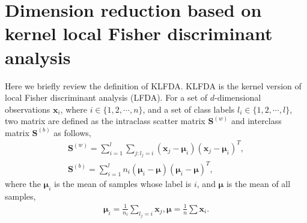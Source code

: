\documentclass[10pt,twocolumn,letterpaper]{article}
\begin{document}
\section{Dimension reduction based on kernel local Fisher discriminant analysis }

Here we briefly review the definition of KLFDA. KLFDA is the kernel version of local Fisher discriminant analysis (LFDA). For a set of $d$-dimensional observations $\bm{x}_i$, where $i\in\{1,2,\cdots,n\}$, and a set of class labels $l_i\in\{1,2,\cdots,l\}$, two matrix are defined as the intraclass scatter matrix $\bm{S}^{(w)}$ and interclass matrix
$\bm{S}^{(b)}$ as follows,
\begin{equation}
\begin{aligned}
\bm{S}^{(w)} = \mathop{\sum} _{i=1}^l\mathop{\sum}_{j:l_j = i} (\bm{x}_j - \bm{\mu}_i)(\bm{x}_j - \bm{\mu}_i)^T, \\
\bm{S}^{(b)} = \mathop{\sum} _{i=1}^l n_i(\bm{\mu}_i - \bm{\mu})(\bm{\mu}_i - \bm{\mu})^T,
\end{aligned}
\end{equation}
where the $\bm{\mu}_i$ is the mean of samples whose label is $i$, and $\bm{\mu}$ is the mean of all samples,
\begin{equation}
\begin{aligned}
\bm{\mu}_i = \frac{1}{n_i} \sum_{l_j=i} \bm{x}_j, 
\bm{\mu} = \frac{1}{n} \sum \bm{x}_i.
\end{aligned}
\end{equation}
\end{document}
